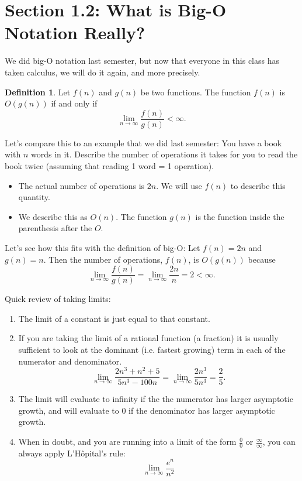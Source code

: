 \documentclass{article}
\theoremstyle{definition}
\newtheorem{definition}[thm]{Definition}
\numberwithin{equation}{section}
\begin{document}
\section{Section 1.2: What is Big-O Notation Really?}

\vspace{0.2in}

We did big-O notation last semester, but now that everyone in this class has taken calculus, we will do it again, and more precisely.

\begin{definition} Let $f(n)$ and $g(n)$ be two functions. The function $f(n)$ is $O(g(n))$ if and only if
\[\lim_{n\to\infty}\frac{f(n)}{g(n)}<\infty.\]
\end{definition}

Let's compare this to an example that we did last semester: You have a book with $n$ words in it. Describe the number of operations it takes for you to read the book twice (assuming that reading 1 word = 1 operation). 
\begin{itemize} 
\item The actual number of operations is $2n$. We will use $f(n)$ to describe this quantity.
\item We describe this as $O(n)$. The function $g(n)$ is the function inside the parenthesis after the $O$.
\end{itemize}
Let's see how this fits with the definition of big-O: Let $f(n)=2n$ and $g(n)=n$. Then the number of operations, $f(n)$, is $O(g(n))$ because
\[\lim_{n\to\infty}\frac{f(n)}{g(n)}=\lim_{n\to\infty}\frac{2n}{n}=2<\infty.\]


Quick review of taking limits:
\begin{enumerate}
\item The limit of a constant is just equal to that constant.
\item If you are taking the limit of a rational function (a fraction) it is usually sufficient to look at the dominant (i.e. fastest growing) term in each of the numerator and denominator. 
\[\lim_{n\to\infty}\frac{2n^3+n^2+5}{5n^3-100n}=\lim_{n\to\infty}\frac{2n^3}{5n^3}=\frac25.\]
\item The limit will evaluate to infinity if the the numerator has larger asymptotic growth, and will evaluate to 0 if the denominator has larger asymptotic growth.
\item When in doubt, and you are running into a limit of the form $\frac{0}{0}$ or $\frac{\infty}{\infty}$, you can always apply L'H\^opital's rule:
\[\lim_{n\to\infty}\frac{e^n}{n^2}\]
\end{enumerate}
\end{document}
